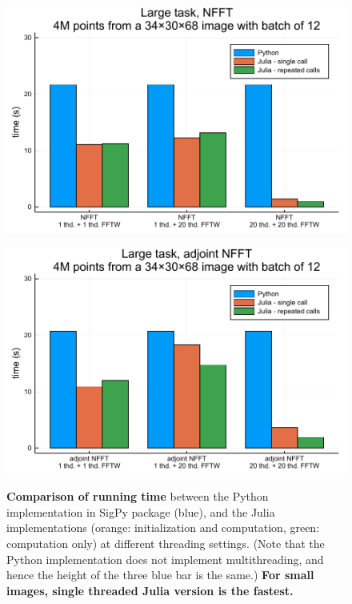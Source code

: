 \begin{figure}
    \centering
    \begin{minipage}{0.48\linewidth}
        \centering
        \includegraphics[width=\linewidth]{images/nfft_large_forw.pdf}
        \label{fig:nfft_large_forw}
    \end{minipage}
    \begin{minipage}{0.48\linewidth}
        \centering
        \includegraphics[width=\linewidth]{images/nfft_large_backw.pdf}
        \label{fig:nfft_large_backw}
    \end{minipage}
    \caption{\textbf{Comparison of running time} between the Python implementation in SigPy package (blue), and the Julia implementations (orange: initialization and computation, green: computation only) at different threading settings. (Note that the Python implementation does not implement multithreading, and hence the height of the three blue bar is the same.) \textbf{For small images, single threaded Julia version is the fastest.}}
    \label{fig:nfft_large}
\end{figure}

